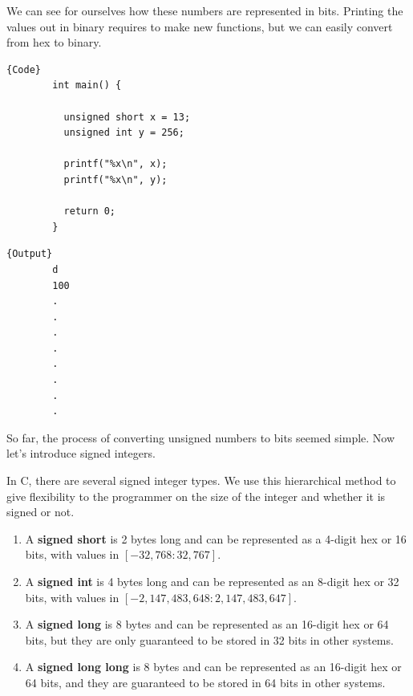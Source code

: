\documentclass{article}
\begin{document}
    \begin{example}
      We can see for ourselves how these numbers are represented in bits. Printing the values out in binary requires to make new functions, but we can easily convert from hex to binary. 

      \noindent\begin{minipage}{.5\textwidth}
      \begin{lstlisting}[]{Code}
        int main() { 

          unsigned short x = 13; 
          unsigned int y = 256;

          printf("%x\n", x);
          printf("%x\n", y);

          return 0; 
        }
      \end{lstlisting}
      \end{minipage}
      \hfill
      \begin{minipage}{.49\textwidth}
      \begin{lstlisting}[]{Output}
        d
        100 
        .
        .
        .
        .
        .
        .
        .
        .
      \end{lstlisting}
      \end{minipage}
    \end{example}

    So far, the process of converting unsigned numbers to bits seemed simple. Now let's introduce signed integers. 

    \begin{definition}
      In C, there are several signed integer types. We use this hierarchical method to give flexibility to the programmer on the size of the integer and whether it is signed or not. 
      \begin{enumerate} 
        \item A \textbf{signed short} is 2 bytes long and can be represented as a 4-digit hex or 16 bits, with values in $[-32,768: 32,767]$. 
        \item A \textbf{signed int} is 4 bytes long and can be represented as an 8-digit hex or 32 bits, with values in $[-2,147,483,648: 2,147,483,647]$. 
        \item A \textbf{signed long} is 8 bytes and can be represented as an 16-digit hex or 64 bits, but they are only guaranteed to be stored in 32 bits in other systems. 
        \item A \textbf{signed long long} is 8 bytes and can be represented as an 16-digit hex or 64 bits, and they are guaranteed to be stored in 64 bits in other systems. 
      \end{enumerate}
    \end{definition}
\end{document}
